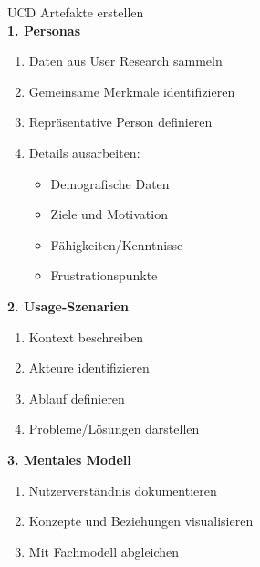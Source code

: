 \begin{KR}{UCD Artefakte erstellen}\\
\textbf{1. Personas}
\begin{enumerate}
    \item Daten aus User Research sammeln
    \item Gemeinsame Merkmale identifizieren
    \item Repräsentative Person definieren
    \item Details ausarbeiten:
    \begin{itemize}
        \item Demografische Daten
        \item Ziele und Motivation
        \item Fähigkeiten/Kenntnisse
        \item Frustrationspunkte
    \end{itemize}
\end{enumerate}

\textbf{2. Usage-Szenarien}
\begin{enumerate}
    \item Kontext beschreiben
    \item Akteure identifizieren
    \item Ablauf definieren
    \item Probleme/Lösungen darstellen
\end{enumerate}

\textbf{3. Mentales Modell}
\begin{enumerate}
    \item Nutzerverständnis dokumentieren
    \item Konzepte und Beziehungen visualisieren
    \item Mit Fachmodell abgleichen
\end{enumerate}
\end{KR}

